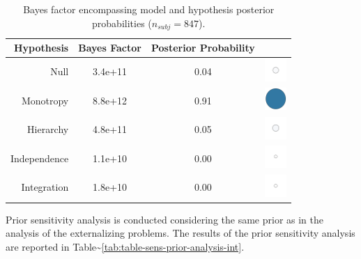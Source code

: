 \documentclass[
]{book}
\begin{document}
\begin{table}[!h]

\caption{\label{tab:table-bf-results-int}Bayes factor encompassing model and hypothesis posterior probabilities  ($n_{subj} = 847$).}
\centering
\begin{tabular}[t]{rcc>{\centering\arraybackslash}m{1cm}}
\toprule
\textbf{Hypothesis} & \textbf{Bayes Factor} & \textbf{Posterior Probability} & \textbf{ }\\
\midrule
Null & 3.4e+11 & 0.04 & \includegraphics[width=0.33in, height=0.33in]{images/ball_BF_int_null.png}\\
Monotropy & 8.8e+12 & 0.91 & \includegraphics[width=0.33in, height=0.33in]{images/ball_BF_int_monotropy.png}\\
Hierarchy & 4.8e+11 & 0.05 & \includegraphics[width=0.33in, height=0.33in]{images/ball_BF_int_hierarchy.png}\\
Independence & 1.1e+10 & 0.00 & \includegraphics[width=0.33in, height=0.33in]{images/ball_BF_int_independence.png}\\
Integration & 1.8e+10 & 0.00 & \includegraphics[width=0.33in, height=0.33in]{images/ball_BF_int_integration.png}\\
\bottomrule
\end{tabular}
\end{table}

Prior sensitivity analysis is conducted considering the same prior as in the analysis of the externalizing problems. The results of the prior sensitivity analysis are reported in Table\textasciitilde\ref{tab:table-sens-prior-analysis-int}.
\end{document}
